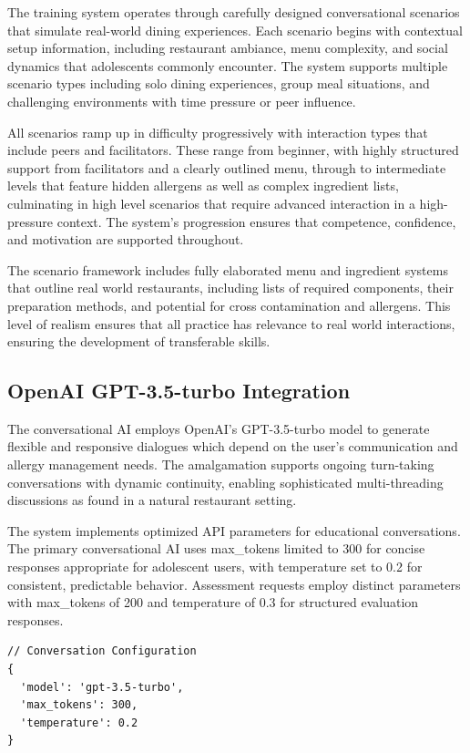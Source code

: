 \documentclass[MScCS]{uccthesis}
\begin{document}
The training system operates through carefully designed conversational scenarios that simulate real-world dining experiences. Each scenario begins with contextual setup information, including restaurant ambiance, menu complexity, and social dynamics that adolescents commonly encounter. The system supports multiple scenario types including solo dining experiences, group meal situations, and challenging environments with time pressure or peer influence.

All scenarios ramp up in difficulty progressively with interaction types that include peers and facilitators. These range from beginner, with highly structured support from facilitators and a clearly outlined menu, through to intermediate levels that feature hidden allergens as well as complex ingredient lists, culminating in high level scenarios that require advanced interaction in a high-pressure context. The system's progression ensures that competence, confidence, and motivation are supported throughout.

The scenario framework includes fully elaborated menu and ingredient systems that outline real world restaurants, including lists of required components, their preparation methods, and potential for cross contamination and allergens. This level of realism ensures that all practice has relevance to real world interactions, ensuring the development of transferable skills.

\subsection{OpenAI GPT-3.5-turbo Integration}
The conversational AI employs OpenAI's GPT-3.5-turbo model to generate flexible and responsive dialogues which depend on the user's communication and allergy management needs. The amalgamation supports ongoing turn-taking conversations with dynamic continuity, enabling sophisticated multi-threading discussions as found in a natural restaurant setting.  

The system implements optimized API parameters for educational conversations. The primary conversational AI uses max\_tokens limited to 300 for concise responses appropriate for adolescent users, with temperature set to 0.2 for consistent, predictable behavior. Assessment requests employ distinct parameters with max\_tokens of 200 and temperature of 0.3 for structured evaluation responses.

\begin{verbatim}
// Conversation Configuration
{
  'model': 'gpt-3.5-turbo',
  'max_tokens': 300,
  'temperature': 0.2
}
\end{verbatim}
\end{document}
